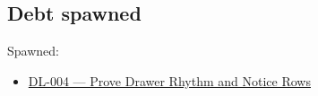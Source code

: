 \subsection{Debt spawned}\label{record-170-debt-spawned}

Spawned:

\begin{itemize}
\tightlist
\item
  \href{https://github.com/flyingrobots/bijou/blob/cbd70612140e7a450d764b3c7be1c6af878b99bc/docs/method/graveyard/legacy-backlog/DL-004-prove-drawer-rhythm-and-notice-rows.md}{DL-004 --- Prove Drawer Rhythm and Notice Rows}
\end{itemize}

